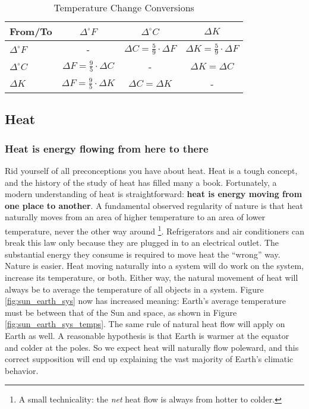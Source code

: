 \begin{table}
\begin{center}
\caption{Temperature Change Conversions} \label{tab:t_change_conversions}
\begin{tabular}{@{}lccc@{}} \toprule
From/To &  $\Delta ^{\circ} F$ & $\Delta ^{\circ} C$ & $\Delta K$\\ \midrule \addlinespace[.4em]
$\Delta ^{\circ} F$ & - & $\Delta C=\frac{5}{9}\cdot\Delta F$ & $\Delta K=\frac{5}{9}\cdot\Delta F$\\ \addlinespace[.4em]
$\Delta ^{\circ} C$ & $\Delta F=\frac{9}{5}\cdot \Delta C$ & - & $\Delta K=\Delta C$\\ \addlinespace[.4em]
$\Delta K$ & $\Delta F=\frac{9}{5}\cdot \Delta K$ & $\Delta C=\Delta K$ & -\\ \midrule
\bottomrule
\end{tabular}
\end{center}
\end{table}

\subsection{Heat}
\subsubsection{Heat is energy flowing from here to there}
Rid yourself of all preconceptions you have about heat. Heat is a tough concept, and the history of the study of heat has filled many a book. Fortunately, a modern understanding of heat is straightforward: \textbf{heat is energy moving from one place to another}. A fundamental observed regularity of nature is that heat naturally moves from an area of higher temperature to an area of lower temperature, never the other way around \footnote{A small technicality: the \emph{net} heat flow is always from hotter to colder.}. Refrigerators and air conditioners can break this law only because they are plugged in to an electrical outlet. The substantial energy they consume is required to move heat the ``wrong'' way. Nature is easier. Heat moving naturally into a system will do work on the system, increase its temperature, or both. Either way, the natural movement of heat will always be to average the temperature of all objects in a system. Figure \ref{fig:sun_earth_sys} now has increased meaning: Earth's average temperature must be between that of the Sun and space, as shown in Figure \ref{fig:sun_earth_sys_temps}. The same rule of natural heat flow will apply on Earth as well. A reasonable hypothesis is that Earth is warmer at the equator and colder at the poles. So we expect heat will naturally flow poleward, and this correct supposition will end up explaining the vast majority of Earth's climatic behavior.


